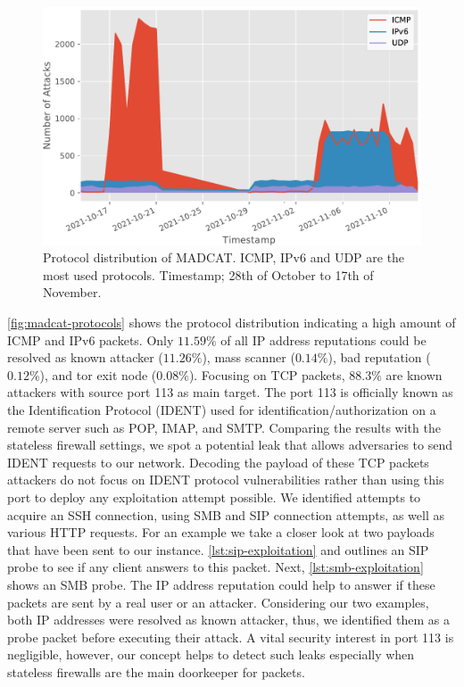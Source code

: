 \begin{figure}[ht]
    \centering
    \includegraphics[width=\textwidth]{figures/madcat-protocol-usage.pdf}
    \caption[Protocol distribution of MADCAT]{Protocol distribution of MADCAT. ICMP, IPv6 and UDP are the most used protocols. Timestamp; 28th of October to 17th of November.}
    \label{fig:madcat-protocols}
\end{figure}

\autoref{fig:madcat-protocols} shows the protocol distribution indicating a high amount of ICMP and IPv6 packets.
Only $11.59\%$ of all IP address reputations could be resolved as known attacker ($11.26\%$), mass scanner ($0.14\%$), bad reputation ($0.12\%$), and tor exit node ($0.08\%$).
Focusing on TCP packets, $88.3\%$ are known attackers with source port 113 as main target.
The port 113 is officially known as the Identification Protocol (IDENT)\cite{rfc1413} used for identification/authorization on a remote server such as POP, IMAP, and SMTP.
Comparing the results with the stateless firewall settings, we spot a potential leak that allows adversaries to send IDENT requests to our network.
Decoding the payload of these TCP packets attackers do not focus on IDENT protocol vulnerabilities rather than using this port to deploy any exploitation attempt possible.
We identified attempts to acquire an SSH connection, using SMB and SIP connection attempts, as well as various HTTP requests.
For an example we take a closer look at two payloads that have been sent to our instance.
\autoref{lst:sip-exploitation} and outlines an SIP probe to see if any client answers to this packet.
Next, \autoref{lst:smb-exploitation} shows an SMB probe.
The IP address reputation could help to answer if these packets are sent by a real user or an attacker.
Considering our two examples, both IP addresses were resolved as known attacker, thus, we identified them as a probe packet before executing their attack.
A vital security interest in port 113 is negligible, however, our concept helps to detect such leaks especially when stateless firewalls are the main doorkeeper for packets.  

